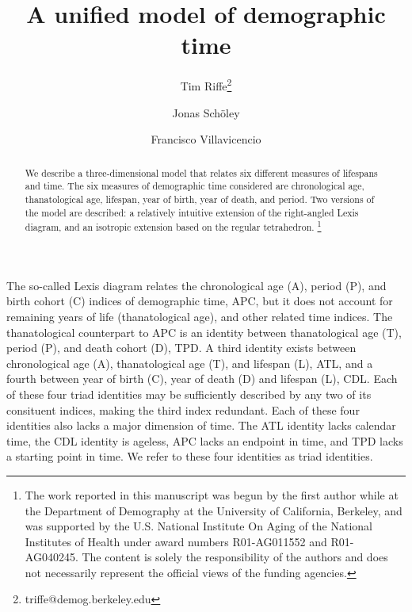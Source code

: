 \documentclass[11pt,oneside,a4paper]{article} %
\newcommand\ackn[1]{%
  \begingroup
  \renewcommand\thefootnote{}\footnote{#1}%
  \addtocounter{footnote}{-1}%
  \endgroup
}
\begin{document}
\title{A unified model of demographic time}

\author[1]{Tim Riffe\thanks{triffe@demog.berkeley.edu}}
\author[2]{Jonas Sch{\"o}ley}
\author[2]{Francisco Villavicencio}


\maketitle

\begin{abstract}
We describe a three-dimensional model that relates six different measures of
lifespans and time. The six measures of demographic time considered are
chronological age, thanatological age, lifespan, year of birth, year of death,
and period. Two versions of the model are described: a relatively intuitive
extension of the right-angled Lexis diagram, and an isotropic extension based on
the regular tetrahedron. \ackn{The work reported in this manuscript was begun by
the first author while at the Department of Demography at the University of
California, Berkeley, and was supported by the U.S.
National Institute On Aging of the National Institutes of Health under award
numbers R01-AG011552 and R01-AG040245. The content is solely the responsibility of the authors and does not necessarily represent the official views of the funding agencies.}
\end{abstract}

The so-called Lexis diagram relates the chronological age (A), period (P),
and birth cohort (C) indices of demographic time, APC, but it does not account
for remaining years of life (thanatological age), and other related time
indices.
The thanatological counterpart to APC is an identity between thanatological
age (T), period (P), and death cohort (D), TPD. A third
identity exists between chronological age (A), thanatological age (T), and lifespan (L), ATL, and a fourth between year of birth (C), year of death (D) and lifespan (L), CDL.
Each of these four triad identities may be sufficiently described by any
two of its consituent indices, making the third index redundant. Each of these
four identities also lacks a major dimension of time. The ATL identity
lacks calendar time, the CDL identity is ageless, APC lacks an endpoint in time,
and TPD lacks a starting point in time. We refer to these four identities
as triad identities.
\end{document}
